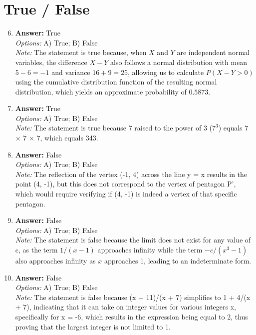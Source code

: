 \documentclass[12pt]{article}
\begin{document}
\section*{True / False}
\begin{enumerate}[label=\arabic*.]
\setcounter{enumi}{5}
\item \textbf{Answer:} True
\\ \textit{Options:} A) True; B) False
\\ \textit{Note:} The statement is true because, when \( X \) and \( Y \) are independent normal variables, the difference \( X - Y \) also follows a normal distribution with mean \( 5 - 6 = -1 \) and variance \( 16 + 9 = 25 \), allowing us to calculate \( P(X - Y > 0) \) using the cumulative distribution function of the resulting normal distribution, which yields an approximate probability of \( 0.5873 \).
\item \textbf{Answer:} True
\\ \textit{Options:} A) True; B) False
\\ \textit{Note:} The statement is true because 7 raised to the power of 3 ($7^3$) equals 7 × 7 × 7, which equals 343.
\item \textbf{Answer:} False
\\ \textit{Options:} A) True; B) False
\\ \textit{Note:} The reflection of the vertex (-1, 4) across the line y = x results in the point (4, -1), but this does not correspond to the vertex of pentagon P', which would require verifying if (4, -1) is indeed a vertex of that specific pentagon.
\item \textbf{Answer:} False
\\ \textit{Options:} A) True; B) False
\\ \textit{Note:} The statement is false because the limit does not exist for any value of c, as the term \(1/(x - 1)\) approaches infinity while the term \(-c/(x^3 - 1)\) also approaches infinity as \(x\) approaches 1, leading to an indeterminate form.
\item \textbf{Answer:} False
\\ \textit{Options:} A) True; B) False
\\ \textit{Note:} The statement is false because (x + 11)/(x + 7) simplifies to 1 + 4/(x + 7), indicating that it can take on integer values for various integers x, specifically for x = -6, which results in the expression being equal to 2, thus proving that the largest integer is not limited to 1.
\end{enumerate}
\end{document}
